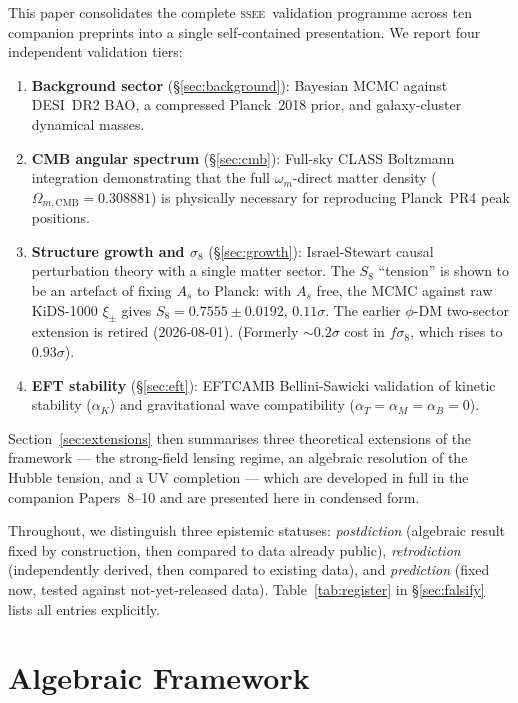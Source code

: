 \documentclass[12pt,a4paper]{article}
\newcommand{\SSEE}{\textsc{ssee}}
\newcommand{\OmmCMB}{\Omega_{m,\mathrm{CMB}}}
\newcommand{\fsig}{f\sigma_8}
\newcommand{\alphaK}{\alpha_K}
\newcommand{\alphaB}{\alpha_B}
\newcommand{\alphaM}{\alpha_M}
\newcommand{\alphaT}{\alpha_T}
\begin{document}
This paper consolidates the complete \SSEE\ validation programme across
ten companion preprints \citep{AlmeidaSSEE2026P1,AlmeidaSSEE2026P2,
AlmeidaSSEE2026P3,AlmeidaSSEE2026P4,AlmeidaSSEE2026P5,AlmeidaSSEE2026P6,
AlmeidaSSEE2026P7,AlmeidaSSEE2026P8,AlmeidaSSEE2026P9,AlmeidaSSEE2026P10}
into a single self-contained presentation.
We report four independent validation tiers:
\begin{enumerate}[leftmargin=*,itemsep=1pt]
\item \textbf{Background sector} (\S\ref{sec:background}): Bayesian MCMC
  against DESI~DR2 BAO, a compressed Planck~2018 prior, and galaxy-cluster
  dynamical masses.
\item \textbf{CMB angular spectrum} (\S\ref{sec:cmb}): Full-sky CLASS Boltzmann
  integration demonstrating that the full $\omega_m$-direct matter density
  ($\OmmCMB=0.308881$) is physically necessary for reproducing Planck~PR4 peak positions.
\item \textbf{Structure growth and $\sigma_8$} (\S\ref{sec:growth}): Israel-Stewart
  causal perturbation theory with a single matter sector. The $S_8$ ``tension''
  is shown to be an artefact of fixing $A_s$ to Planck: with $A_s$ free, the MCMC
  against raw KiDS-1000 $\xi_\pm$ gives $S_8=0.7555\pm0.0192$, $0.11\sigma$. The
  earlier $\phi$-DM two-sector extension is retired (2026-08-01). (Formerly $\sim0.2\sigma$
  cost in $\fsig$, which rises to $0.93\sigma$).
\item \textbf{EFT stability} (\S\ref{sec:eft}): EFTCAMB Bellini-Sawicki
  validation of kinetic stability ($\alphaK$) and gravitational wave compatibility
  ($\alphaT = \alphaM = \alphaB = 0$).
\end{enumerate}
Section~\ref{sec:extensions} then summarises three theoretical extensions of the
framework --- the strong-field lensing regime, an algebraic resolution of the
Hubble tension, and a UV completion --- which are developed in full in the
companion Papers~8--10 and are presented here in condensed form.

Throughout, we distinguish three epistemic statuses: \textit{postdiction}
(algebraic result fixed by construction, then compared to data already public),
\textit{retrodiction} (independently derived, then compared to existing data),
and \textit{prediction} (fixed now, tested against not-yet-released data).
Table~\ref{tab:register} in \S\ref{sec:falsify} lists all entries explicitly.


\section{Algebraic Framework}
\label{sec:theory}
\end{document}
